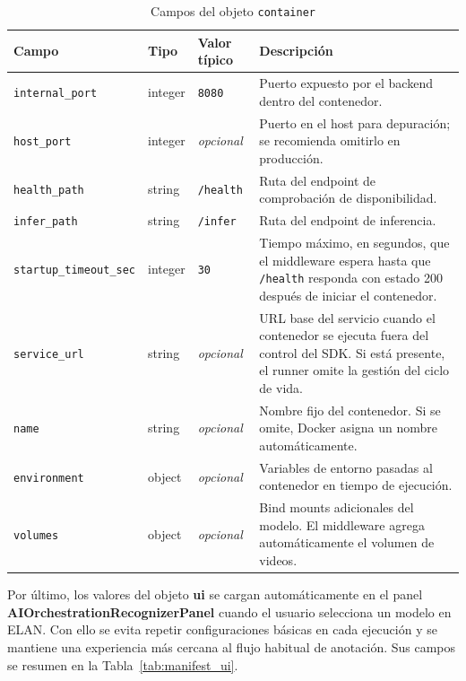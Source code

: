 \begin{table}[H]
\centering
\caption{Campos del objeto \texttt{container}}
\label{tab:manifest_container}
\scriptsize
\renewcommand{\arraystretch}{1.08}
\setlength{\tabcolsep}{3.5pt}

\begin{tabular}{
    >{\raggedright\arraybackslash}p{3.3cm}
    >{\raggedright\arraybackslash}p{1.5cm}
    >{\raggedright\arraybackslash}p{2.4cm}
    >{\raggedright\arraybackslash}p{6.0cm}
}
\toprule
\textbf{Campo} & \textbf{Tipo} & \textbf{Valor típico} & \textbf{Descripción} \\
\midrule
\texttt{internal\_port} & integer & \texttt{8080} & Puerto expuesto por el backend dentro del contenedor. \\
\texttt{host\_port} & integer & \textit{opcional} & Puerto en el host para depuración; se recomienda omitirlo en producción. \\
\texttt{health\_path} & string & \texttt{/health} & Ruta del endpoint de comprobación de disponibilidad. \\
\texttt{infer\_path} & string & \texttt{/infer} & Ruta del endpoint de inferencia. \\
\texttt{startup\_timeout\_sec} & integer & \texttt{30} & Tiempo máximo, en segundos, que el middleware espera hasta que \texttt{/health} responda con estado 200 después de iniciar el contenedor. \\
\texttt{service\_url} & string & \textit{opcional} & URL base del servicio cuando el contenedor se ejecuta fuera del control del SDK. Si está presente, el runner omite la gestión del ciclo de vida. \\
\texttt{name} & string & \textit{opcional} & Nombre fijo del contenedor. Si se omite, Docker asigna un nombre automáticamente. \\
\texttt{environment} & object & \textit{opcional} & Variables de entorno pasadas al contenedor en tiempo de ejecución. \\
\texttt{volumes} & object & \textit{opcional} & Bind mounts adicionales del modelo. El middleware agrega automáticamente el volumen de videos. \\
\bottomrule
\end{tabular}
\end{table}

Por último, los valores del objeto \textbf{ui} se cargan automáticamente en el panel \textbf{AIOrchestrationRecognizerPanel} cuando el usuario selecciona un modelo en ELAN. Con ello se evita repetir configuraciones básicas en cada ejecución y se mantiene una experiencia más cercana al flujo habitual de anotación. Sus campos se resumen en la Tabla~\ref{tab:manifest_ui}.

